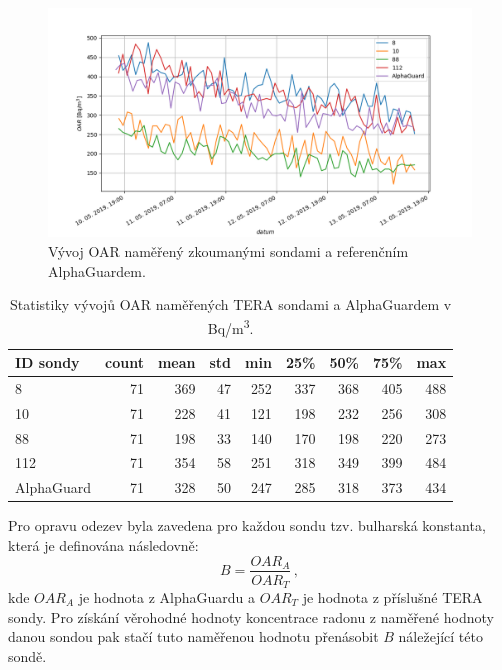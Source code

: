 \begin{figure}[H]
	\centering
	\includegraphics[width=1\linewidth]{images/sondy_srovnani}
	\caption{Vývoj OAR naměřený zkoumanými sondami a referenčním AlphaGuardem.}
	\label{fig:dynMer_sondySrovnani}
\end{figure}
\begin{table}[ht]
	\centering
	\caption{Statistiky vývojů OAR naměřených TERA sondami a AlphaGuardem v \si{Bq/m^3}.}
	\label{tab:dynMer_sondy}
	\begin{tabular}{lrrrrrrrr}
		\toprule
		ID sondy &  count &  mean &  std &  min &  25\% &  50\% &  75\% &  max \\
		\midrule
		8          &     71 &   369 &   47 &  252 &  337 &  368 &  405 &  488 \\
		10         &     71 &   228 &   41 &  121 &  198 &  232 &  256 &  308 \\
		88         &     71 &   198 &   33 &  140 &  170 &  198 &  220 &  273 \\
		112        &     71 &   354 &   58 &  251 &  318 &  349 &  399 &  484 \\
		\midrule
		AlphaGuard &     71 &   328 &   50 &  247 &  285 &  318 &  373 &  434 \\
		\bottomrule
	\end{tabular}
\end{table}

Pro opravu odezev byla zavedena pro každou sondu tzv. bulharská konstanta, která je definována následovně:
\begin{equation}
	B=\frac{OAR_A}{OAR_T}\,,
\end{equation}
kde $OAR_A$ je hodnota z AlphaGuardu a $OAR_T$ je hodnota z příslušné TERA sondy. Pro získání věrohodné hodnoty koncentrace radonu z naměřené hodnoty danou sondou pak stačí tuto naměřenou hodnotu přenásobit $B$ náležející této sondě.

